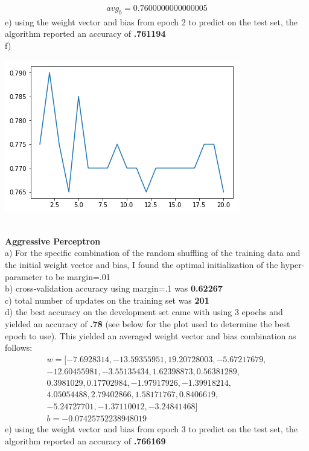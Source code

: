 \documentclass[11pt,a4paper]{article}
\begin{document}
\begin{enumerate}
\begin{gather}
			avg_b = 0.7600000000000005
			\end{gather}
			e) using the weight vector and bias from epoch 2 to predict on the test set, the algorithm reported an accuracy of \textbf{.761194} \\
			f)
			\begin{center}
				\includegraphics[width=0.7\linewidth]{average_plot}
			\end{center}
			~\\
			\textbf{Aggressive Perceptron}    \\
			a) For the specific combination of the random shuffling of the training data and the initial weight vector and bias, I found the optimal initialization of the hyper-parameter to be margin=.01  \\
			b) cross-validation accuracy using margin=.1 was \textbf{0.62267}\\
			c) total number of updates on the training set was \textbf{201}\\
			d) the best accuracy on the development set came with using 3 epochs and yielded an accuracy of \textbf{.78} (see below for the plot used to determine the best epoch to use). This yielded an averaged weight vector and bias combination as follows:\\
			\begin{gather}
			w = [ -7.6928314 , -13.59355951,  19.20728003,  -5.67217679,\\
       -12.60455981,  -3.55135434,   1.62398873,   0.56381289,\\
         0.3981029 ,   0.17702984,  -1.97917926,  -1.39918214,\\
         4.05054488,   2.79402866,   1.58171767,   0.8406619 ,\\
        -5.24727701,  -1.37110012,  -3.24841468]\\
			b = -0.07425752238948019
			\end{gather}
			e) using the weight vector and bias from epoch 3 to predict on the test set, the algorithm reported an accuracy of \textbf{.766169}\\

\end{enumerate}
\end{document}
